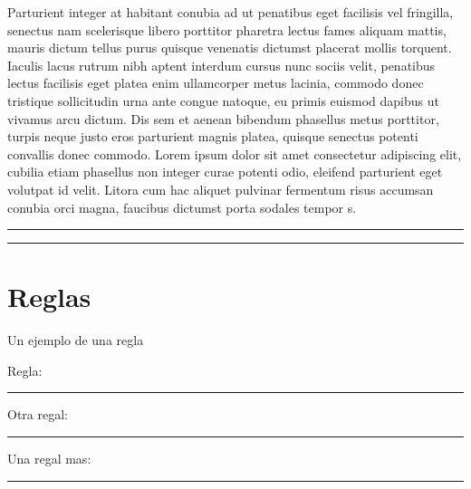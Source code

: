 \documentclass{article}
\begin{document}
\begin{multicols}{3}
	Parturient integer at habitant conubia ad ut penatibus eget facilisis vel fringilla, senectus nam scelerisque libero porttitor pharetra lectus fames aliquam mattis, mauris dictum tellus purus quisque venenatis dictumst placerat mollis torquent. Iaculis lacus rutrum nibh aptent interdum cursus nunc sociis velit, penatibus lectus facilisis eget platea enim ullamcorper metus lacinia, commodo donec tristique sollicitudin urna ante congue natoque, eu primis euismod dapibus ut vivamus arcu dictum. Dis sem et aenean bibendum phasellus metus porttitor, turpis neque justo eros parturient magnis platea, quisque senectus potenti convallis donec commodo.
Lorem ipsum dolor sit amet consectetur adipiscing elit, cubilia etiam phasellus non integer curae potenti odio, eleifend parturient eget volutpat id velit. Litora cum hac aliquet pulvinar fermentum risus accumsan conubia orci magna, faucibus dictumst porta sodales tempor s.
	\end{multicols}
	
	\noindent\rule{\textwidth}{2pt}\rule{1pt}{50pt}
	
	\section{Reglas}
	Un ejemplo de una regla
	
	Regla: \rule{\textwidth}{2pt}
	
	Otra regal: \rule{100pt}{5pt}
	
	Una regal mas: \rule[-5mm]{100pt}{7pt}
	
	
	
\end{document}
